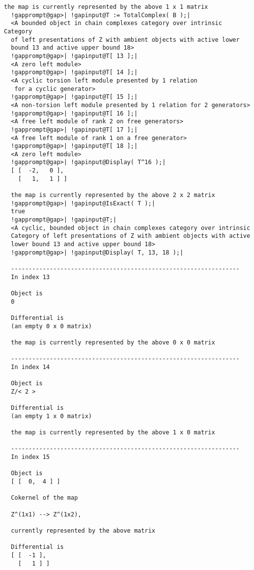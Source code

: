 \documentclass[a4paper,11pt]{report}
\begin{document}
{\begin{Verbatim}[commandchars=!@|,fontsize=\small,frame=single,label=Example]
  the map is currently represented by the above 1 x 1 matrix
  !gapprompt@gap>| !gapinput@T := TotalComplex( B );|
  <A bounded object in chain complexes category over intrinsic Category 
  of left presentations of Z with ambient objects with active lower 
  bound 13 and active upper bound 18>
  !gapprompt@gap>| !gapinput@T[ 13 ];|
  <A zero left module>
  !gapprompt@gap>| !gapinput@T[ 14 ];|
  <A cyclic torsion left module presented by 1 relation
   for a cyclic generator>
  !gapprompt@gap>| !gapinput@T[ 15 ];|
  <A non-torsion left module presented by 1 relation for 2 generators>
  !gapprompt@gap>| !gapinput@T[ 16 ];|
  <A free left module of rank 2 on free generators>
  !gapprompt@gap>| !gapinput@T[ 17 ];|
  <A free left module of rank 1 on a free generator>
  !gapprompt@gap>| !gapinput@T[ 18 ];|
  <A zero left module>
  !gapprompt@gap>| !gapinput@Display( T^16 );|
  [ [  -2,   0 ],
    [   1,   1 ] ]
  
  the map is currently represented by the above 2 x 2 matrix
  !gapprompt@gap>| !gapinput@IsExact( T );|
  true
  !gapprompt@gap>| !gapinput@T;|
  <A cyclic, bounded object in chain complexes category over intrinsic 
  Category of left presentations of Z with ambient objects with active 
  lower bound 13 and active upper bound 18>
  !gapprompt@gap>| !gapinput@Display( T, 13, 18 );|
  
  -----------------------------------------------------------------
  In index 13
  
  Object is
  0
  
  Differential is
  (an empty 0 x 0 matrix)
  
  the map is currently represented by the above 0 x 0 matrix
  
  -----------------------------------------------------------------
  In index 14
  
  Object is
  Z/< 2 > 
  
  Differential is
  (an empty 1 x 0 matrix)
  
  the map is currently represented by the above 1 x 0 matrix
  
  -----------------------------------------------------------------
  In index 15
  
  Object is
  [ [  0,  4 ] ]
  
  Cokernel of the map
  
  Z^(1x1) --> Z^(1x2),
  
  currently represented by the above matrix
  
  Differential is
  [ [  -1 ],
    [   1 ] ]
  

\end{Verbatim}}
\end{document}
